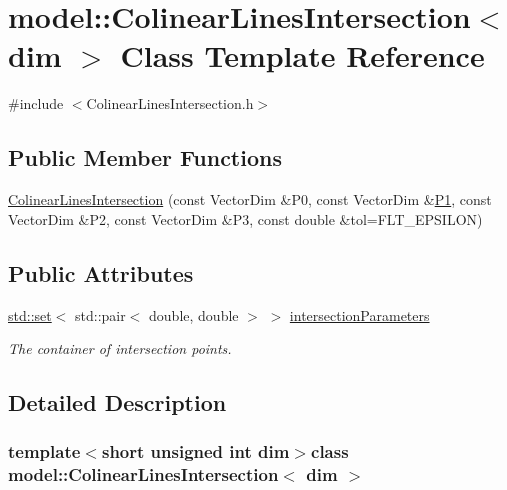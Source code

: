 \hypertarget{classmodel_1_1_colinear_lines_intersection}{}\section{model\+:\+:Colinear\+Lines\+Intersection$<$ dim $>$ Class Template Reference}
\label{classmodel_1_1_colinear_lines_intersection}


{\ttfamily \#include $<$Colinear\+Lines\+Intersection.\+h$>$}

\subsection*{Public Member Functions}
\begin{DoxyCompactItemize}
\item 
\hyperlink{classmodel_1_1_colinear_lines_intersection_a482614a227a0d6a776aa376eef1ea253}{Colinear\+Lines\+Intersection} (const Vector\+Dim \&P0, const Vector\+Dim \&\hyperlink{run_multipole_8m_af93dd7f73e57b8b17d34efa33f0f948e}{P1}, const Vector\+Dim \&P2, const Vector\+Dim \&P3, const double \&tol=F\+L\+T\+\_\+\+E\+P\+S\+I\+L\+O\+N)
\end{DoxyCompactItemize}
\subsection*{Public Attributes}
\begin{DoxyCompactItemize}
\item 
\hyperlink{plot_cells_8m_a03623d69001c34fc77654be29bdc3d8a}{std\+::set}$<$ std\+::pair$<$ double, double $>$ $>$ \hyperlink{classmodel_1_1_colinear_lines_intersection_a5a5456972981a546e59d45aba059480d}{intersection\+Parameters}
\begin{DoxyCompactList}\small\item\em The container of intersection points. \end{DoxyCompactList}\end{DoxyCompactItemize}


\subsection{Detailed Description}
\subsubsection*{template$<$short unsigned int dim$>$class model\+::\+Colinear\+Lines\+Intersection$<$ dim $>$}

